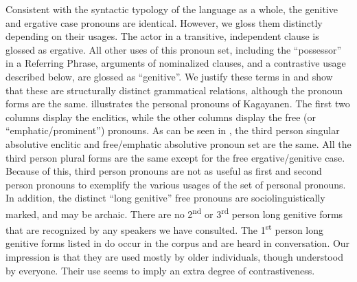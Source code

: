 Consistent with the syntactic typology of the language as a whole, the genitive and ergative case pronouns are identical. However, we gloss them distinctly depending on their usages. The actor in a transitive, independent clause is glossed as ergative. All other uses of this pronoun set, including the “possessor” in a Referring Phrase, arguments of nominalized clauses, and a contrastive usage described below, are glossed as “genitive”. We justify these terms in   and show that these are structurally distinct grammatical relations, although the pronoun forms are the same.
 illustrates the personal pronouns of Kagayanen. The first two columns display the enclitics, while the other columns display the free (or “emphatic/prominent”) pronouns. As can be seen in , the third person singular absolutive enclitic and free/emphatic absolutive pronoun set are the same. All the third person plural forms are the same except for the free ergative/genitive case. Because of this, third person pronouns are not as useful as first and second person pronouns to exemplify the various usages of the set of personal pronouns. In addition, the distinct “long genitive” free pronouns are sociolinguistically marked, and may be archaic. There are no 2\textsuperscript{nd} or 3\textsuperscript{rd} person long genitive forms that are recognized by any speakers we have consulted. The 1\textsuperscript{st} person long genitive forms listed in  do occur in the corpus and are heard in conversation. Our impression is that they are used mostly by older individuals, though understood by everyone. Their use seems to imply an extra degree of contrastiveness.

